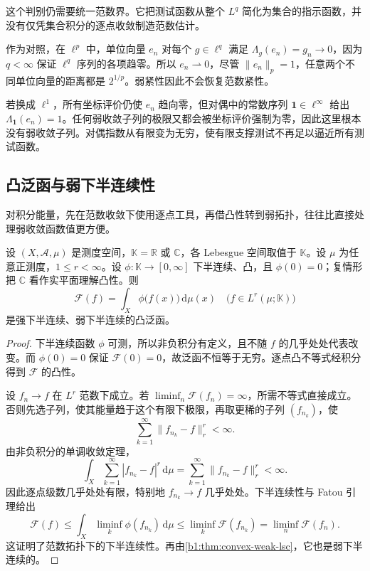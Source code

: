 这个判别仍需要统一范数界。它把测试函数从整个 \(L^q\) 简化为集合的指示函数，并没有仅凭集合积分的逐点收敛制造范数估计。

\ProseParagraphBreak

作为对照，在 \(\ell^p\) 中，单位向量 \(e_n\) 对每个 \(g\in\ell^q\) 满足
\(\Lambda_g(e_n)=g_n\rightarrow0\)，因为 \(q<\infty\) 保证 \(\ell^q\) 序列的各项趋零。所以 \(e_n\rightharpoonup0\)，尽管 \(\|e_n\|_p=1\)，任意两个不同单位向量的距离都是 \(2^{1/p}\)。弱紧性因此不会恢复范数紧性。

\ProseParagraphBreak

若换成 \(\ell^1\)，所有坐标评价仍使 \(e_n\) 趋向零，但对偶中的常数序列 \(\mathbf1\in\ell^\infty\) 给出 \(\Lambda_{\mathbf1}(e_n)=1\)。任何弱收敛子列的极限又都会被坐标评价强制为零，因此这里根本没有弱收敛子列。对偶指数从有限变为无穷，使有限支撑测试不再足以逼近所有测试函数。

\subsection{凸泛函与弱下半连续性}
\label{b1:subsec:100403}

对积分能量，先在范数收敛下使用逐点工具，再借凸性转到弱拓扑，往往比直接处理弱收敛函数值更方便。

\begin{proposition}[凸积分泛函的弱下半连续性]\label{b1:prop:convex-integral-weak-lsc}
设 \((X,\mathcal A,\mu)\) 是测度空间，\(\mathbb K=\mathbb R\) 或 \(\mathbb C\)，各 Lebesgue 空间取值于 \(\mathbb K\)。设 \(\mu\) 为任意正测度，\(1\le r<\infty\)。设
\(\phi:\mathbb K\rightarrow[0,\infty]\) 下半连续、凸，且 \(\phi(0)=0\)；复情形把 \(\mathbb C\) 看作实平面理解凸性。则
\[
 \mathcal F(f)=\int_X\phi\bigl(f(x)\bigr)\,\mathrm d\mu(x)
 \quad\bigl(f\in L^r(\mu;\mathbb K)\bigr)
\]
是强下半连续、弱下半连续的凸泛函。
\end{proposition}
\begin{proof}
下半连续函数 \(\phi\) 可测，所以非负积分有定义，且不随 \(f\) 的几乎处处代表改变。而 \(\phi(0)=0\) 保证 \(\mathcal F(0)=0\)，故泛函不恒等于无穷。逐点凸不等式经积分得到 \(\mathcal F\) 的凸性。

设 \(f_n\rightarrow f\) 在 \(L^r\) 范数下成立。若 \(\liminf_n\mathcal F(f_n)=\infty\)，所需不等式直接成立。否则先选子列，使其能量趋于这个有限下极限，再取更稀的子列 \((f_{n_k})\)，使
\[
 \sum_{k=1}^{\infty}\|f_{n_k}-f\|_r^r<\infty.
\]
由非负积分的单调收敛定理，
\[
 \int_X\sum_{k=1}^{\infty}|f_{n_k}-f|^r\,\mathrm d\mu
 =\sum_{k=1}^{\infty}\|f_{n_k}-f\|_r^r<\infty.
\]
因此逐点级数几乎处处有限，特别地 \(f_{n_k}\rightarrow f\) 几乎处处。下半连续性与 Fatou 引理给出
\[
 \mathcal F(f)\le
 \int_X\liminf_k\phi(f_{n_k})\,\mathrm d\mu
 \le\liminf_k\mathcal F(f_{n_k})
 =\liminf_n\mathcal F(f_n).
\]
这证明了范数拓扑下的下半连续性。再由\cref{b1:thm:convex-weak-lsc}，它也是弱下半连续的。
\end{proof}

